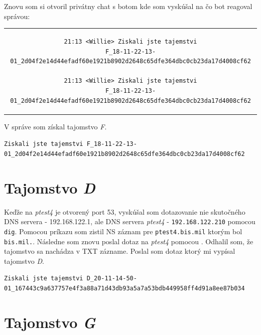 \documentclass[11pt,a4paper]{article}
\begin{document}
Znovu som si otvoril privátny chat s botom kde som vyskúšal  na čo bot reagoval správou:

\begin{center}
\begin{tabular}{c}
\begin{lstlisting}[basicstyle=\footnotesize]
21:13 <Willie> Ziskali jste tajemstvi
F_18-11-22-13-01_2d04f2e14d44efadf60e1921b8902d2648c65dfe364dbc0cb23da17d4008cf62

21:13 <Willie> Ziskali jste tajemstvi
F_18-11-22-13-01_2d04f2e14d44efadf60e1921b8902d2648c65dfe364dbc0cb23da17d4008cf62
\end{lstlisting}
\end{tabular}
\end{center}

V správe som získal tajomstvo \textit{F}.

\begin{center}
\small{\texttt{Ziskali jste tajemstvi F\_18-11-22-13-01\_2d04f2e14d44efadf60e1921b8902d2648c65dfe364dbc0cb23da17d4008cf62}}
\end{center}

\section{Tajomstvo \textit{D}}\label{sec:D}

Keďže na \textit{ptest4} je otvorený port 53, vyskúšal som dotazovanie nie skutočného DNS servera - 192.168.122.1, ale DNS servera \textit{ptest4} - \texttt{192.168.122.210} pomocou \texttt{dig}. Pomocou príkazu  som zistil NS záznam pre \texttt{ptest4.bis.mil} ktorým bol \texttt{bis.mil.}. Následne som znovu poslal dotaz na \textit{ptest4} pomocou . Odhalil som, že tajomstvo sa nachádza v TXT zázname. Poslal som dotaz  ktorý mi vypísal tajomstvo \textit{D}.

\begin{center}
\small{\texttt{Ziskali jste tajemstvi D\_20-11-14-50-01\_167443c9a637757e4f3a88a71d43db93a5a7a53bdb449958ff4d91a8ee87b034}}
\end{center}

\section{Tajomstvo \textit{G}}\label{sec:G}
\end{document}
